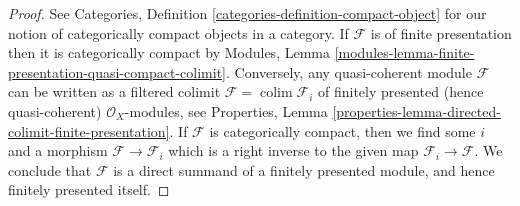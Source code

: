 \documentclass[10pt,a4paper]{amsart}
\theoremstyle{plain}
\theoremstyle{definition}
\theoremstyle{remark}
\numberwithin{equation}{subsection}
\def\colim{\mathop{\mathrm{colim}}\nolimits}
\begin{document}
\begin{proof}
See Categories, Definition \ref{categories-definition-compact-object}
for our notion of categorically compact objects in a category.
If $\mathcal{F}$ is of finite presentation then it is categorically compact by
Modules, Lemma \ref{modules-lemma-finite-presentation-quasi-compact-colimit}.
Conversely, any quasi-coherent module $\mathcal{F}$ can be written
as a filtered colimit $\mathcal{F} = \colim \mathcal{F}_i$ of
finitely presented (hence quasi-coherent)
$\mathcal{O}_X$-modules, see Properties, Lemma
\ref{properties-lemma-directed-colimit-finite-presentation}.
If $\mathcal{F}$ is categorically compact, then we find
some $i$ and a morphism $\mathcal{F} \to \mathcal{F}_i$
which is a right inverse to the given map $\mathcal{F}_i \to \mathcal{F}$.
We conclude that $\mathcal{F}$ is a direct summand of a
finitely presented module, and hence finitely presented itself.
\end{proof}
\end{document}
